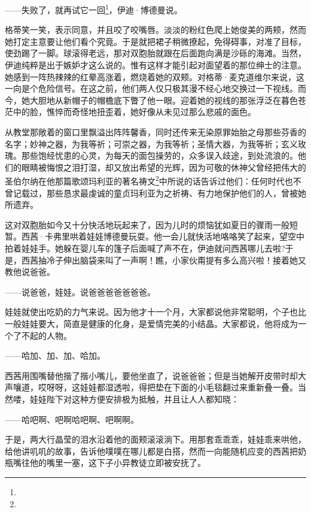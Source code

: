 \par ——失败了，就再试它一回\footnote{}，伊迪·博德曼说。
\par 格蒂笑一笑，表示同意，并且咬了咬嘴唇。淡淡的粉红色爬上她俊美的两颊，然而她打定主意要让他们看个究竟。于是就把裙子稍微撩起，免得碍事，对准了目标，使劲踢了一脚。球滚得老远，那对双胞胎就跟在后面跑向满是沙砾的海滩。当然，伊迪纯粹是出于嫉妒才这么说的。惟有这样才能引起对面望着的那位绅士的注意。她感到一阵热辣辣的红晕高涨着，燃烧着她的双颊。对格蒂·麦克道维尔来说，这一向是个危险信号。在这之前，他们两人仅只极其漫不经心地交换过一下视线。而今，她大胆地从新帽子的帽檐底下瞥了他一眼。迎着她的视线的那张浮泛在暮色苍茫中的脸，憔悴而奇怪地扭歪着，她好像从未见过那么悲戚的面色。
\par 从教堂那敞着的窗口里飘溢出阵阵馨香，同时还传来无染原罪始胎之母那些芬香的名字；妙神之器，为我等祈；可崇之器，为我等祈；圣情大器，为我等祈；玄义玫瑰。那些饱经忧患的心灵，为每天的面包操劳的，众多误入歧途，到处流浪的。他们的眼睛被悔恨之泪打湿，却又放出希望的光辉，因为可敬的休神父曾经把伟大的圣伯尔纳在他那篇歌颂玛利亚的著名祷文\footnote{}中所说的话告诉过他们：任何时代也不曾记载过，那些恳求最虔诚的童贞玛利亚为之祈祷、有力地保护他们的人，曾被她所遗弃。
\par 这对双胞胎如今又十分快活地玩起来了，因为儿时的烦恼犹如夏日的骤雨一般短暂。西茜·卡弗里哄着娃娃博德曼玩耍。他一会儿就快活地咯咯笑了起来，望空中拍着娃娃手。她躲在婴儿车的篷子后面喊了声不在，伊迪就问西茜哪儿去啦?于是，西茜抽冷子伸出脑袋来叫了一声啊！瞧，小家伙甭提有多么高兴啦！接着她又教他说爸爸。
\par ——说爸爸，娃娃。说爸爸爸爸爸爸爸。
\par 娃娃就使出吃奶的力气来说。因为他才十一个月，大家都说他非常聪明，个子也比一般娃娃要大，简直是健康的化身，是爱情完美的小结晶。大家都说，他将成为一个了不起的人物。
\par ——哈加、加、加、哈加。
\par 西茜用围嘴替他揩了揩小嘴儿，要他坐直了，说爸爸爸；但是当她解开皮带时却大声嚷道，哎呀呀，这娃娃都湿透啦，得把垫在下面的小毛毯翻过来重新叠一叠。当然喽，娃娃陛下对这种方便安排极为抵触，并且让人人都知晓：
\par ——哈吧啊、吧啊哈吧啊、吧啊啊。
\par 于是，两大行晶莹的泪水沿着他的面颊滚滚淌下。用那套乖乖乖，娃娃乖来哄他，给他讲叽叽的故事，告诉他噗噗在哪儿都是白搭，然而一向能随机应变的西茜把奶瓶嘴往他的嘴里一塞，这下子小异教徒立即被安抚了。
